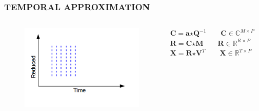 \documentclass{beamer}
\begin{document}
\begin{frame}
\frametitle{TEMPORAL APPROXIMATION}
\begin{columns}[c]
\begin{figure}
\includegraphics[width=\textwidth]{tmp_1}
\end{figure}
$\textbf{C} = \textbf{a} \bm{\star} \textbf{Q}^{-1} \qquad \textbf{C} \in \mathbb{C}^{M \times P}$\\
$\textbf{R} = \textbf{C} \bm{\star} \textbf{M} \qquad \textbf{R} \in \mathbb{R}^{R \times P}$
$\textbf{X} = \textbf{R} \bm{\star} \textbf{V}^{T} \qquad \textbf{X} \in \mathbb{R}^{T \times P}$\\
\end{columns}
\end{frame}
\end{document}
